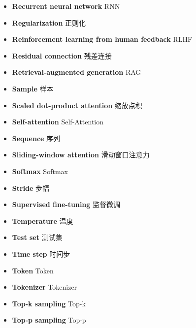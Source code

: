 \begin{itemize}[leftmargin=1.2em,itemsep=2pt,topsep=3pt]
\item {\sffamily\bfseries Recurrent neural network} \quad RNN\quad {}
\item {\sffamily\bfseries Regularization} \quad 正则化\quad {}
\item {\sffamily\bfseries Reinforcement learning from human feedback} \quad RLHF\quad {}
\item {\sffamily\bfseries Residual connection} \quad 残差连接\quad {}
\item {\sffamily\bfseries Retrieval-augmented generation} \quad RAG\quad {}
\item {\sffamily\bfseries Sample} \quad 样本\quad {}
\item {\sffamily\bfseries Scaled dot-product attention} \quad 缩放点积\quad {}
\item {\sffamily\bfseries Self-attention} \quad Self-Attention\quad {}
\item {\sffamily\bfseries Sequence} \quad 序列\quad {}
\item {\sffamily\bfseries Sliding-window attention} \quad 滑动窗口注意力\quad {}
\item {\sffamily\bfseries Softmax} \quad Softmax\quad {}
\item {\sffamily\bfseries Stride} \quad 步幅\quad {}
\item {\sffamily\bfseries Supervised fine-tuning} \quad 监督微调\quad {}
\item {\sffamily\bfseries Temperature} \quad 温度\quad {}
\item {\sffamily\bfseries Test set} \quad 测试集\quad {}
\item {\sffamily\bfseries Time step} \quad 时间步\quad {}
\item {\sffamily\bfseries Token} \quad Token\quad {}
\item {\sffamily\bfseries Tokenizer} \quad Tokenizer\quad {}
\item {\sffamily\bfseries Top-k sampling} \quad Top-k\quad {}
\item {\sffamily\bfseries Top-p sampling} \quad Top-p\quad {}

\end{itemize}
